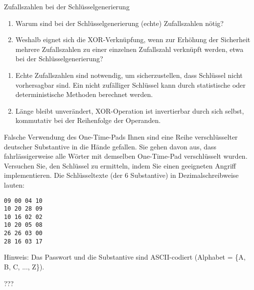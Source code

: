 \documentclass{article}
\begin{document}
\begin{exercise}{Zufallszahlen bei der Schlüsselgenerierung}
  \begin{enumerate}
    \item Warum sind bei der Schlüsselgenerierung (echte) Zufallszahlen nötig?
    \item Weshalb eignet sich die XOR-Verknüpfung, wenn zur Erhöhung der Sicherheit mehrere Zufallszahlen zu einer einzelnen Zufallszahl verknüpft werden, etwa bei der Schlüsselgenerierung?
  \end{enumerate}

  \begin{solution}
    \begin{enumerate}
        \item Echte Zufallszahlen sind notwendig, um sicherzustellen, dass Schlüssel nicht vorhersagbar sind. Ein nicht zufälliger Schlüssel kann durch statistische oder deterministische Methoden berechnet werden.
        \item Länge bleibt unverändert, XOR-Operation ist invertierbar durch sich selbst, kommutativ bei der Reihenfolge der Operanden.
    \end{enumerate}
  \end{solution}
\end{exercise}

\begin{exercise}{Falsche Verwendung des One-Time-Pads}
  Ihnen sind eine Reihe verschlüsselter deutscher Substantive in die Hände gefallen. Sie gehen davon aus, dass fahrlässigerweise alle Wörter mit demselben One-Time-Pad verschlüsselt wurden. Versuchen Sie, den Schlüssel zu ermitteln, indem Sie einen geeigneten Angriff implementieren. Die Schlüsseltexte (der 6 Substantive) in Dezimalschreibweise lauten:

  \begin{center}
    \texttt{09 00 04 10} \\
    \texttt{10 20 28 09} \\
    \texttt{10 16 02 02} \\
    \texttt{10 20 05 08} \\
    \texttt{26 26 03 00} \\
    \texttt{28 16 03 17}
  \end{center}

  Hinweis: Das Passwort und die Substantive sind ASCII-codiert (Alphabet = \{A, B, C, ..., Z\}).

  \begin{solution}
    ???
  \end{solution}
\end{exercise}
\end{document}

